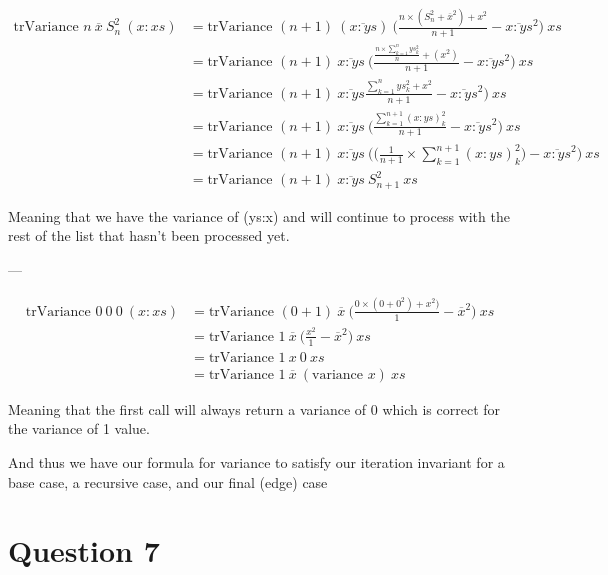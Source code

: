 \documentclass{article}
\begin{document}
$$
\begin{aligned}
        \text{trVariance } n \ \overline{x} \ S^2_n \ (x:xs) & = \text{trVariance } (n + 1) \ (\overline{x:ys}) \ \Big(\frac{n \times (S^2_n + \overline{x}^2) + x^2}{n + 1} - \overline{x:ys}^2\Big) \ xs\\
        & = \text{trVariance } (n + 1) \ \overline{x:ys} \ \Big(\frac{\frac{n \times \sum_{k=1}^n ys_k^2}{n} + (x^2)}{n + 1} - \overline{x:ys}^2\Big) \ xs\\
        & = \text{trVariance } (n + 1) \ \overline{x:ys} \frac{\sum_{k=1}^n ys_k^2 + x^2}{n + 1} - \overline{x:ys}^2\Big) \ xs\\
        & = \text{trVariance } (n + 1) \ \overline{x:ys} \ \Big(\frac{\sum^{n+1}_{k=1}(x:ys)_k^2}{n + 1} - \overline{x:ys}^2 \Big) \ xs\\
        & = \text{trVariance } (n + 1) \ \overline{x:ys} \ \Bigg(\Big(\frac{1}{n + 1} \times \sum_{k=1}^{n+1} (x:ys)_k^2\Big) - \overline{x:ys}^2 \Bigg) \ xs\\
        & = \text{trVariance } (n + 1) \ \overline{x:ys} \ S^2_{n+1} \ xs
\end{aligned}
$$

Meaning that we have the variance of (ys:x) and will continue to process with the rest of the list that hasn't been processed yet.

---

$$
\begin{aligned}
        \text{trVariance } 0\ 0\ 0\ (x:xs) & = \text{trVariance } (0 + 1)\ \overline{x}\ \Big(\frac{0 \times (0 + 0^2) + x^2)}{1} - \overline{x}^2\Big)\ xs \\
        & = \text{trVariance } 1\ \overline{x}\ \Big(\frac{x^2}{1} - \overline{x}^2\Big)\ xs\\
        & = \text{trVariance } 1\ x\ 0\ xs\\
        & = \text{trVariance } 1\ \overline{x}\ (\text{variance } x)\ xs
\end{aligned}
$$

Meaning that the first call will always return a variance of 0 which is correct for the variance of 1 value.

And thus we have our formula for variance to satisfy our iteration invariant for a base case, a recursive case, and our final (edge) case

\clearpage

\section{Question 7}
\end{document}
